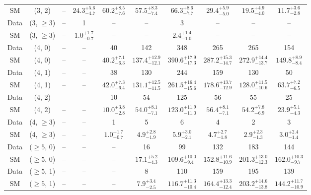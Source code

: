 \begin{table}[h!]
{\begin{tabular}{cccccccccc}
	SM & (3, 2) & -- & $24.3^{+ 5.6 }_{- 4.7 }$ & $60.2^{+ 8.5 }_{- 7.6 }$ & $57.5^{+ 8.3 }_{- 7.4 }$ & $66.3^{+ 8.6 }_{- 7.7 }$ & $29.4^{+ 5.9 }_{- 5.0 }$ & $19.5^{+ 4.9 }_{- 4.0 }$ & $11.7^{+ 3.6 }_{- 2.8 }$ \\[0.5ex] 
	Data & (3, $\ge3$) & -- & 1 & -- & -- & 3 & -- & -- & -- \\[0.5ex] 
	SM & (3, $\ge3$) & -- & $1.0^{+ 1.7 }_{- 0.7 }$ & -- & -- & $2.4^{+ 1.4 }_{- 1.0 }$ & -- & -- & -- \\[0.5ex] 
	Data & (4, 0) & -- & -- & 40 & 142 & 348 & 265 & 265 & 154 \\[0.5ex] 
	SM & (4, 0) & -- & -- & $40.2^{+ 7.1 }_{- 6.3 }$ & $137.4^{+ 12.9 }_{- 12.1 }$ & $390.6^{+ 17.9 }_{- 17.3 }$ & $287.2^{+ 15.3 }_{- 14.7 }$ & $272.9^{+ 14.4 }_{- 13.7 }$ & $149.8^{+ 8.9 }_{- 8.4 }$ \\[0.5ex] 
	Data & (4, 1) & -- & -- & 38 & 130 & 244 & 159 & 130 & 50 \\[0.5ex] 
	SM & (4, 1) & -- & -- & $42.0^{+ 7.3 }_{- 6.4 }$ & $131.1^{+ 12.5 }_{- 11.5 }$ & $261.5^{+ 16.4 }_{- 15.6 }$ & $178.6^{+ 13.7 }_{- 12.9 }$ & $128.0^{+ 11.5 }_{- 10.6 }$ & $63.7^{+ 7.2 }_{- 6.5 }$ \\[0.5ex] 
	Data & (4, 2) & -- & -- & 10 & 54 & 125 & 56 & 55 & 25 \\[0.5ex] 
	SM & (4, 2) & -- & -- & $10.0^{+ 3.8 }_{- 2.8 }$ & $54.0^{+ 8.1 }_{- 7.1 }$ & $123.0^{+ 11.9 }_{- 11.0 }$ & $56.4^{+ 8.1 }_{- 7.1 }$ & $54.2^{+ 7.8 }_{- 6.9 }$ & $23.9^{+ 5.1 }_{- 4.3 }$ \\[0.5ex] 
	Data & (4, $\ge3$) & -- & -- & 1 & 5 & 6 & 4 & 2 & 3 \\[0.5ex] 
	SM & (4, $\ge3$) & -- & -- & $1.0^{+ 1.7 }_{- 0.7 }$ & $4.9^{+ 2.8 }_{- 1.9 }$ & $5.9^{+ 3.0 }_{- 2.1 }$ & $4.7^{+ 2.7 }_{- 1.8 }$ & $2.9^{+ 2.3 }_{- 1.3 }$ & $3.0^{+ 2.4 }_{- 1.4 }$ \\[0.5ex] 
	Data & ($\ge5$, 0) & -- & -- & -- & 16 & 99 & 132 & 183 & 144 \\[0.5ex] 
	SM & ($\ge5$, 0) & -- & -- & -- & $17.1^{+ 5.2 }_{- 4.3 }$ & $109.6^{+ 10.0 }_{- 9.4 }$ & $152.8^{+ 11.6 }_{- 10.9 }$ & $201.3^{+ 13.0 }_{- 12.3 }$ & $162.0^{+ 10.3 }_{- 9.7 }$ \\[0.5ex] 
	Data & ($\ge5$, 1) & -- & -- & -- & 8 & 110 & 159 & 195 & 139 \\[0.5ex] 
	SM & ($\ge5$, 1) & -- & -- & -- & $7.9^{+ 3.4 }_{- 2.5 }$ & $116.7^{+ 11.3 }_{- 10.4 }$ & $164.4^{+ 13.3 }_{- 12.4 }$ & $203.2^{+ 14.6 }_{- 13.8 }$ & $144.2^{+ 11.7 }_{- 10.9 }$ \\[0.5ex] 

\end{tabular}}
\end{table}
